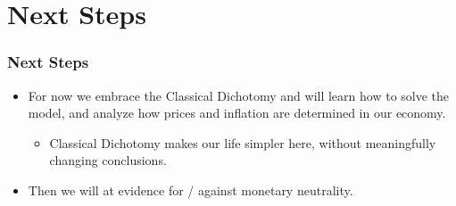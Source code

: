 \documentclass[english,xcolor=svgnames]{beamer}
\begin{document}
\section{Next Steps}


\begin{frame}
\frametitle{Next Steps
}
\begin{itemize}
	\item For now we embrace the Classical Dichotomy and will learn how to solve the model, and analyze how prices and inflation are determined in our economy.
	\begin{itemize}
		\item Classical Dichotomy makes our life simpler here, without meaningfully changing conclusions.
	\end{itemize}
	\item Then we will at evidence for / against monetary neutrality.
\end{itemize}
\end{frame}
\end{document}
